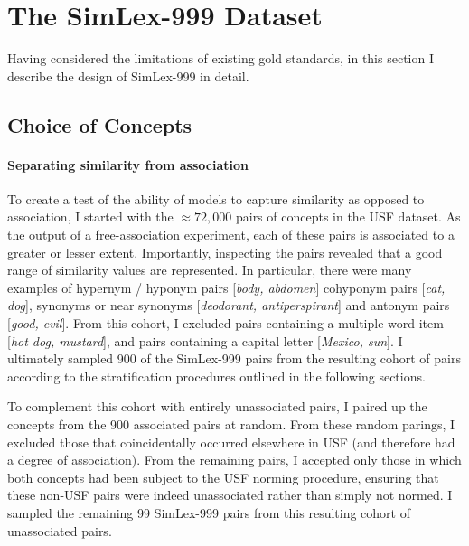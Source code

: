 \section{The SimLex-999 Dataset} 
\label{simlex}

Having considered the limitations of existing gold standards, in this section I describe the design of SimLex-999 in detail. 

\subsection{Choice of Concepts}

\paragraph{Separating similarity from association}To create a test of the ability of models to capture similarity as opposed to association, I started with the \(\approx 72,000\) pairs of concepts in the USF dataset. As the output of a free-association experiment, each of these pairs is associated to a greater or lesser extent. Importantly, inspecting the pairs revealed that a good range of similarity values are represented. In particular, there were many examples of hypernym / hyponym pairs [\emph{body, abdomen}] cohyponym pairs [\emph{cat, dog}], synonyms or near synonyms [\emph{deodorant, antiperspirant}] and antonym pairs [\emph{good, evil}]. From this cohort, I excluded pairs containing a multiple-word item [\emph{hot dog, mustard}], and pairs containing a capital letter [\emph{Mexico, sun}]. I ultimately sampled 900 of the SimLex-999 pairs from the resulting cohort of pairs according to the stratification procedures outlined in the following sections. 


To complement this cohort with entirely unassociated pairs, I paired up the concepts from the 900 associated pairs at random. From these random parings, I excluded those that coincidentally occurred elsewhere in USF (and therefore had a degree of association). From the remaining pairs, I accepted only those in which both concepts had been subject to the USF norming procedure, ensuring that these non-USF pairs were indeed unassociated rather than simply not normed. I sampled the remaining 99 SimLex-999 pairs from this resulting cohort of unassociated pairs.  

